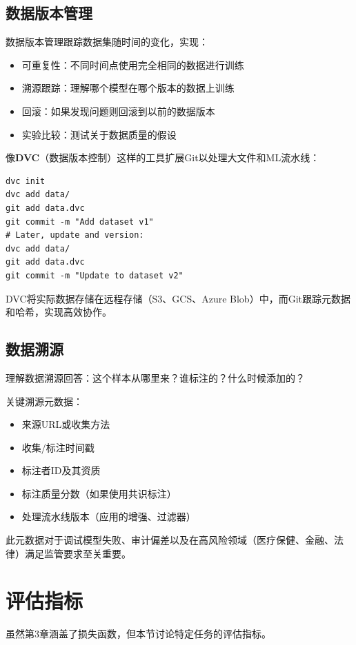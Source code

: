 \subsection{数据版本管理}

数据版本管理跟踪数据集随时间的变化，实现：
\begin{itemize}
    \item 可重复性：不同时间点使用完全相同的数据进行训练
    \item 溯源跟踪：理解哪个模型在哪个版本的数据上训练
    \item 回滚：如果发现问题则回滚到以前的数据版本
    \item 实验比较：测试关于数据质量的假设
\end{itemize}

像\textbf{DVC}（数据版本控制）这样的工具扩展Git以处理大文件和ML流水线：
\begin{verbatim}
dvc init
dvc add data/
git add data.dvc
git commit -m "Add dataset v1"
# Later, update and version:
dvc add data/
git add data.dvc
git commit -m "Update to dataset v2"
\end{verbatim}

DVC将实际数据存储在远程存储（S3、GCS、Azure Blob）中，而Git跟踪元数据和哈希，实现高效协作。

\subsection{数据溯源}

理解数据溯源回答：这个样本从哪里来？谁标注的？什么时候添加的？

关键溯源元数据：
\begin{itemize}
    \item 来源URL或收集方法
    \item 收集/标注时间戳
    \item 标注者ID及其资质
    \item 标注质量分数（如果使用共识标注）
    \item 处理流水线版本（应用的增强、过滤器）
\end{itemize}

此元数据对于调试模型失败、审计偏差以及在高风险领域（医疗保健、金融、法律）满足监管要求至关重要。

\section{评估指标}

虽然第3章涵盖了损失函数，但本节讨论特定任务的评估指标。

